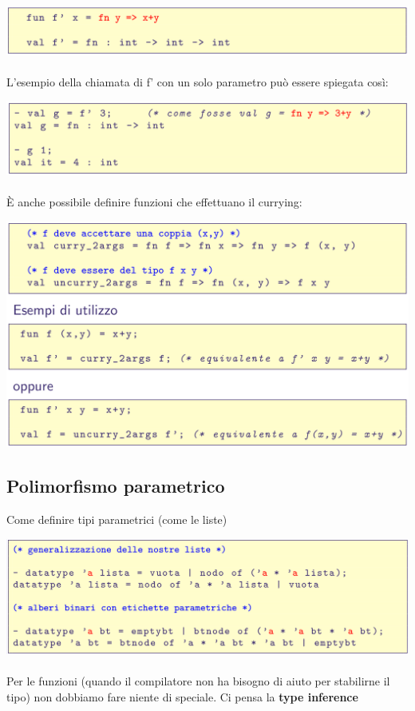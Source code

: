\documentclass[10pt]{article}
\begin{document}
\includegraphics[scale=0.2]{Immagini/ml40.png}
\\\\
L’esempio della chiamata di f’ con un solo parametro può essere
spiegata così:

\includegraphics[scale=0.2]{Immagini/ml41.png}
\\\\
È anche possibile definire funzioni che effettuano il currying:


\includegraphics[scale=0.2]{Immagini/ml42.png}
\subsection{Polimorfismo parametrico}
Come definire tipi parametrici (come le liste)

\includegraphics[scale=0.2]{Immagini/ml43.png}
\\\\
Per le funzioni (quando il compilatore non ha bisogno di aiuto
per stabilirne il tipo) non dobbiamo fare niente di speciale.
Ci pensa la \textbf{type inference}
\end{document}
